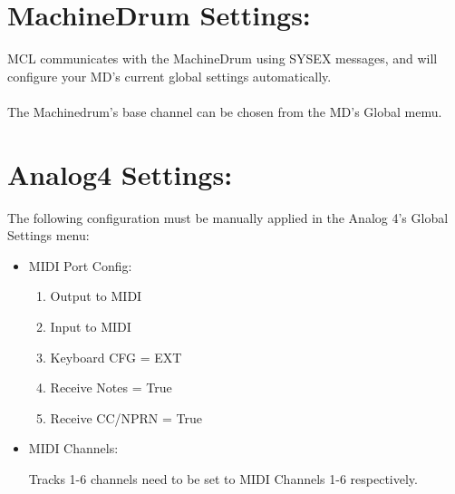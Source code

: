 \section{MachineDrum Settings:}

MCL communicates with the MachineDrum using SYSEX messages, and will configure your MD's current global settings automatically.
\\\\The Machinedrum's base channel can be chosen from the MD's Global memu.

\section{Analog4 Settings:}

The following configuration must be manually applied in the Analog 4's Global Settings menu:

\begin{itemize}

\item{MIDI Port Config:}
\begin{enumerate}
\item{Output to MIDI}
\item{Input to MIDI}
\item{Keyboard CFG = EXT}
\item{Receive Notes = True}
\item{Receive CC/NPRN = True}
\end{enumerate}
\item{MIDI Channels:}

Tracks 1-6 channels need to be set to MIDI Channels 1-6 respectively.

\end{itemize}
